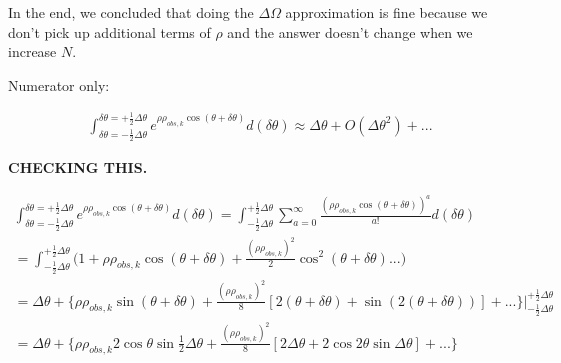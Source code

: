 \documentclass[12pt]{article}
\begin{document}
In the end, we concluded that doing the $\Delta\Omega$ approximation is fine because we don't pick up additional terms of $\rho$ and the answer doesn't change when we increase $N$. 

Numerator only:

        \begin{align}
        \int_{\delta\theta=-\frac{1}{2}\Delta\theta}^{\delta\theta=+\frac{1}{2}\Delta\theta} e^{\rho\rho_{obs,k}\cos(\theta+\delta\theta)}d(\delta\theta) \approx \Delta\theta + O(\Delta\theta^2)+...
        \end{align}
        
{\textbf{CHECKING THIS.}}

	\begin{align}
        \int_{\delta\theta=-\frac{1}{2}\Delta\theta}^{\delta\theta=+\frac{1}{2}\Delta\theta} e^{\rho\rho_{obs,k}\cos(\theta+\delta\theta)}d(\delta\theta) = \int_{-\frac{1}{2}\Delta\theta}^{+\frac{1}{2}\Delta\theta} \sum_{a=0}^{\infty} \frac{(\rho\rho_{obs,k}\cos(\theta+\delta\theta))^a}{a!}d(\delta\theta) \\
        = \int_{-\frac{1}{2}\Delta\theta}^{+\frac{1}{2}\Delta\theta} \Big( 1 + \rho\rho_{obs,k}\cos(\theta+\delta\theta) + \frac{(\rho\rho_{obs,k})^2}{2}\cos^2(\theta+\delta\theta) ... \Big) \\
        = \Delta\theta + \Big\{\rho\rho_{obs,k}\sin(\theta+\delta\theta) + \frac{(\rho\rho_{obs,k})^2}{8}[2(\theta+\delta\theta) + \sin(2(\theta+\delta\theta))] + ... \Big\}\Big|^{+\frac{1}{2}\Delta\theta}_{-\frac{1}{2}\Delta\theta}\\
        = \Delta\theta + \Big\{\rho\rho_{obs,k}2\cos\theta\sin\frac{1}{2}\Delta\theta + \frac{(\rho\rho_{obs,k})^2}{8}[2\Delta\theta + 2\cos2\theta\sin\Delta\theta] + ... \Big\}
        \end{align}
\end{document}

